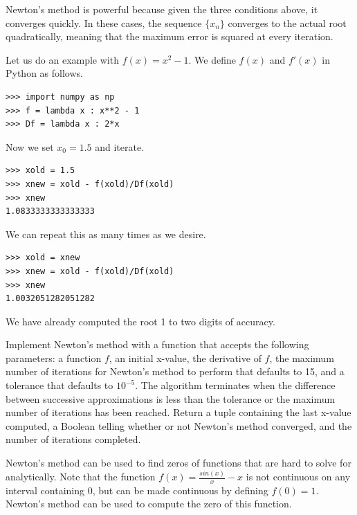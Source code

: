 Newton's method is powerful because given the three conditions above, it converges quickly.
In these cases, the sequence $\{x_n\}$ converges to the actual root quadratically, meaning that the maximum error is squared at every iteration.

Let us do an example with $f(x) = x^2-1$.
We define $f(x)$ and $f'(x)$ in Python as follows.
\begin{lstlisting}
>>> import numpy as np
>>> f = lambda x : x**2 - 1
>>> Df = lambda x : 2*x
\end{lstlisting}
Now we set $x_0 = 1.5$ and iterate.
\begin{lstlisting}
>>> xold = 1.5
>>> xnew = xold - f(xold)/Df(xold)
>>> xnew
1.0833333333333333
\end{lstlisting}
We can repeat this as many times as we desire.
\begin{lstlisting}
>>> xold = xnew
>>> xnew = xold - f(xold)/Df(xold)
>>> xnew
1.0032051282051282
\end{lstlisting}
We have already computed the root 1 to two digits of accuracy.


\begin{problem}
\label{prob:newton_arr}
Implement Newton's method with a function that accepts the following parameters: a function $f$, an initial x-value, the derivative of $f$, the maximum number of iterations for Newton's method to perform that defaults to 15, and a tolerance that defaults to $10^{-5}$.
The algorithm terminates when the difference between successive approximations is less than the tolerance or the maximum number of iterations has been reached. Return a tuple containing the last x-value computed, a Boolean telling whether or not Newton's method converged, and the number of iterations completed.
\end{problem}

\begin{info}
\leavevmode
Newton's method can be used to find zeros of functions that are hard to solve for analytically.
Note that the function $f(x) = \frac{sin(x)}{x}-x$ is not continuous on any interval containing 0, but can be made continuous by defining $f(0)=1$. Newton's method can be used to compute the zero of this function.
\end{info}

